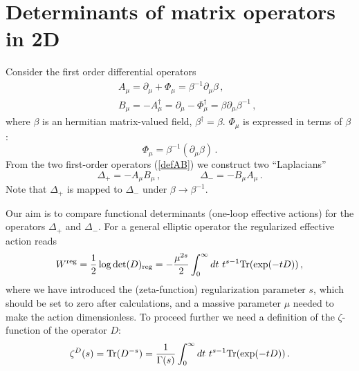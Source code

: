 \documentclass[a4paper,12pt]{article}
\begin{document}
\section{Determinants of  matrix operators in 2D }\label{2Dsec}
Consider the first order differential operators
\begin{eqnarray}
&& A_\mu =
\partial_\mu +\Phi_{\mu}=\beta^{-1} \partial_\mu \beta \,, \nonumber \\
&&B_\mu =-A_\mu^\dag =\partial_\mu -\Phi_{\mu}^\dag =\beta \partial_\mu
\beta^{-1} \,,
\label{defAB}
\end{eqnarray}
where $\beta$ is an hermitian matrix-valued field, $\beta^\dag =\beta$.
$\Phi_{\mu}$ is expressed in terms of $\beta$ :
\begin{equation}
\Phi_\mu =\beta^{-1}(\partial_\mu \beta )\,.
\label{phiPhi}
\end{equation}
From the two first-order operators (\ref{defAB}) we construct 
two ``Laplacians''
\begin{equation}
\Delta_+=- A_\mu B_\mu\,, \qquad\qquad \Delta_-=-B_\mu A_\mu \,.
\label{defD+-}
\end{equation}
Note that $\Delta_+$ is mapped to $\Delta_-$ under $\beta\to\beta^{-1}$.

Our aim is to compare functional determinants (one-loop effective actions)
for the operators $\Delta_+$ and $\Delta_-$. For a general elliptic
operator
the regularized effective action reads
\begin{equation}
W^{\mbox{\scriptsize reg}}=\frac 12 \log \det (D)_{\mbox{\scriptsize reg}}
= -\frac{\mu^{2s}}{2}
\int_0^\infty dt~t^{s-1}
{\rm Tr} (\exp (-tD)) \,, \label{effact}
\end{equation}
where we have introduced the (zeta-function) regularization
parameter $s$, which should be set to zero after calculations,
and a massive parameter $\mu$ needed to make the action
dimensionless. To proceed further we need a definition of
the $\zeta$-function of the operator $D$:
\begin{equation}
\zeta^D (s)= {\rm Tr}(D^{-s})=
\frac 1{\Gamma (s)} \int_0^\infty dt~t^{s-1}
{\rm Tr} (\exp (-tD)) \,. \label{defzD}
\end{equation}
\end{document}
